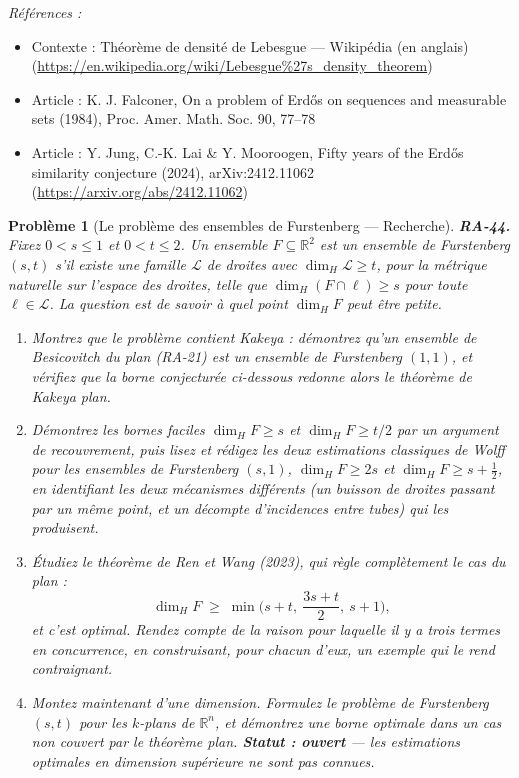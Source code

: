 \documentclass[11pt]{article}
\newtheorem{problem}{Problème}
\newenvironment{refs}{\par\small\noindent\emph{Références :}\begin{itemize}\setlength\itemsep{0pt}}{\end{itemize}\normalsize}
\begin{document}
\begin{refs}
\item Contexte : Théorème de densité de Lebesgue --- Wikipédia (en anglais) (\url{https://en.wikipedia.org/wiki/Lebesgue%27s_density_theorem})
\item Article : K. J. Falconer, \og{} On a problem of Erd\H{o}s on sequences and measurable sets \fg{} (1984), Proc. Amer. Math. Soc. 90, 77--78
\item Article : Y. Jung, C.-K. Lai \& Y. Mooroogen, \og{} Fifty years of the Erd\H{o}s similarity conjecture \fg{} (2024), arXiv:2412.11062 (\url{https://arxiv.org/abs/2412.11062})
\end{refs}

\bigskip

\begin{problem}[{Le problème des ensembles de Furstenberg --- Recherche}]
\textbf{RA-44.} Fixez $ 0 < s \le 1 $ et $ 0 < t \le 2 $. Un ensemble
$ F \subseteq \mathbb{R}^2 $ est un \textit{ensemble de Furstenberg $ (s,t) $} s'il existe une
famille $ \mathcal{L} $ de droites avec $ \dim_H \mathcal{L} \ge t $, pour la métrique naturelle
sur l'espace des droites, telle que $ \dim_H (F \cap \ell) \ge s $ pour toute
$ \ell \in \mathcal{L} $. La question est de savoir à quel point $ \dim_H F $ peut être
petite.
\begin{enumerate}
\item[(a)] Montrez que le problème contient Kakeya : démontrez qu'un ensemble de Besicovitch du plan
(RA-21) est un ensemble de Furstenberg $ (1,1) $, et vérifiez que la borne conjecturée ci-dessous
redonne alors le théorème de Kakeya plan.
\item[(b)] Démontrez les bornes faciles $ \dim_H F \ge s $ et $ \dim_H F \ge t/2 $ par un argument de
recouvrement, puis lisez et rédigez les deux estimations classiques de Wolff pour les ensembles de
Furstenberg $ (s,1) $, $ \dim_H F \ge 2s $ et $ \dim_H F \ge s + \tfrac12 $, en identifiant
les deux mécanismes différents (un buisson de droites passant par un même point, et un décompte
d'incidences entre tubes) qui les produisent.
\item[(c)] Étudiez le théorème de Ren et Wang (2023), qui règle complètement le cas du plan :
\[ \dim_H F \;\ge\; \min\Big( s+t, \ \frac{3s+t}{2}, \ s+1 \Big), \]
et c'est optimal. Rendez compte de la raison pour laquelle il y a trois termes en concurrence, en
construisant, pour chacun d'eux, un exemple qui le rend contraignant.
\item[(d)] Montez maintenant d'une dimension. Formulez le problème de Furstenberg $ (s,t) $ pour les
$ k $-plans de $ \mathbb{R}^n $, et démontrez une borne optimale dans un cas non couvert par le
théorème plan. \textbf{Statut : ouvert} --- les estimations optimales en dimension supérieure ne sont
pas connues.
\end{enumerate}

\end{problem}
\end{document}
